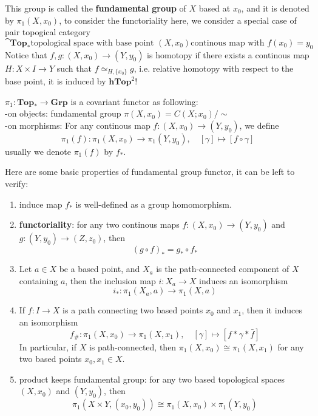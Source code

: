 \documentclass[12pt,a4paper]{article}
\begin{document}
This group is called the \textbf{fundamental group} of \(X\) based at \(x_0\), and it is denoted by \(\pi_1(X,x_0)\), to consider the functoriality here, we consider a special case of pair topogical category
\[\cat{\mathbf{Top}_*}{\text{topological space with base point }(X,x_0)}{\text{continous map with } f(x_0) = y_0}\]
Notice that \(f,g:(X,x_0) \to (Y,y_0)\) is homotopy if there exists a continous map \(H:X \times I \to Y\) such that \(f \simeq_{H,\{x_0\}} g\), i.e. relative homotopy with respect to the base point, it is induced by \(\mathbf{hTop}^2\)!
\begin{definition}
    \(\pi_1: \mathbf{Top}_* \to \mathbf{Grp}\) is a covariant functor as following:\\

    -on objects: fundamental group \(\pi(X,x_0) = C(X;x_0)/\sim \)\\

    -on morphisms: For any continous map \(f:(X,x_0) \to (Y,y_0)\), we define
    \[\pi_1(f): \pi_1(X,x_0) \to \pi_1(Y,y_0), \quad [\gamma] \mapsto [f \circ \gamma]\]
    usually we denote \(\pi_1(f)\) by \(f_*\).
\end{definition}

Here are some basic properties of fundamental group functor, it can be left to verify:
\begin{enumerate}
    \item induce map \(f_*\) is well-defined as a group homomorphism.
    \item \textbf{functoriality}: for any two continous maps \(f:(X,x_0) \to (Y,y_0)\) and \(g:(Y,y_0) \to (Z,z_0)\), then
    \[(g \circ f)_* = g_* \circ f_*\]
    \item Let \(a \in X\) be a based point, and \(X_a\) is the path-connected component of \(X\) containing \(a\), then the inclusion map \(i:X_a \to X\) induces an isomorphism
    \[i_*: \pi_1(X_a,a) \to \pi_1(X,a)\]
    \item If \(f:I \to X\) is a path connecting two based points \(x_0\) and \(x_1\), then it induces an isomorphism
    \[f_{\#}:\pi_1(X,x_0) \to \pi_1(X,x_1), \quad [\gamma] \mapsto [f * \gamma * \bar{f}]\]
    In particular, if \(X\) is path-connected, then \(\pi_1(X,x_0) \cong \pi_1(X,x_1)\) for any two based points \(x_0,x_1 \in X\).
    \item product keeps fundamental group: for any two based topological spaces \((X,x_0)\) and \((Y,y_0)\), then
    \[\pi_1(X \times Y, (x_0,y_0)) \cong \pi_1(X,x_0) \times \pi_1(Y,y_0)\]
\end{enumerate}
\end{document}

